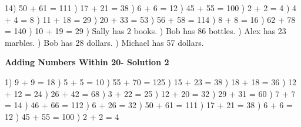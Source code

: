 \documentclass{article}%
\begin{document}
14) 50 + 61 = 111%
) 17 + 21 = 38%
) 6 + 6 = 12%
) 45 + 55 = 100%
) 2 + 2 = 4%
) 4 + 4 = 8%
) 11 + 18 = 29%
) 20 + 33 = 53%
) 56 + 58 = 114%
) 8 + 8 = 16%
) 62 + 78 = 140%
) 10 + 19 = 29%
) Sally has 2 books.%
) Bob has 86 bottles.%
) Alex has 23 marbles.%
) Bob has 28 dollars.%
) Michael has 57 dollars.%
\newline%
\newpage%
\large%
\begin{center}%
\textbf{Adding Numbers Within 20- Solution 2}%
\newline%
\end{center} \normalsize%
1) 9 + 9 = 18%
) 5 + 5 = 10%
) 55 + 70 = 125%
) 15 + 23 = 38%
) 18 + 18 = 36%
) 12 + 12 = 24%
) 26 + 42 = 68%
) 3 + 22 = 25%
) 12 + 20 = 32%
) 29 + 31 = 60%
) 7 + 7 = 14%
) 46 + 66 = 112%
) 6 + 26 = 32%
) 50 + 61 = 111%
) 17 + 21 = 38%
) 6 + 6 = 12%
) 45 + 55 = 100%
) 2 + 2 = 4%
\newline%
\end{document}
